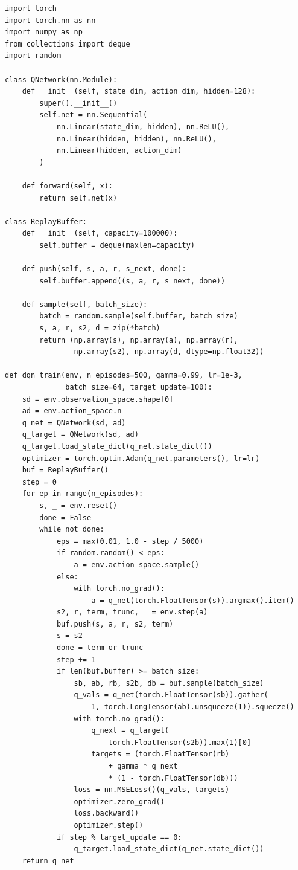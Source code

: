 \begin{codeblock}[title=\textbf{Minimal DQN with PyTorch}]
\begin{verbatim}
import torch
import torch.nn as nn
import numpy as np
from collections import deque
import random

class QNetwork(nn.Module):
    def __init__(self, state_dim, action_dim, hidden=128):
        super().__init__()
        self.net = nn.Sequential(
            nn.Linear(state_dim, hidden), nn.ReLU(),
            nn.Linear(hidden, hidden), nn.ReLU(),
            nn.Linear(hidden, action_dim)
        )

    def forward(self, x):
        return self.net(x)

class ReplayBuffer:
    def __init__(self, capacity=100000):
        self.buffer = deque(maxlen=capacity)

    def push(self, s, a, r, s_next, done):
        self.buffer.append((s, a, r, s_next, done))

    def sample(self, batch_size):
        batch = random.sample(self.buffer, batch_size)
        s, a, r, s2, d = zip(*batch)
        return (np.array(s), np.array(a), np.array(r),
                np.array(s2), np.array(d, dtype=np.float32))

def dqn_train(env, n_episodes=500, gamma=0.99, lr=1e-3,
              batch_size=64, target_update=100):
    sd = env.observation_space.shape[0]
    ad = env.action_space.n
    q_net = QNetwork(sd, ad)
    q_target = QNetwork(sd, ad)
    q_target.load_state_dict(q_net.state_dict())
    optimizer = torch.optim.Adam(q_net.parameters(), lr=lr)
    buf = ReplayBuffer()
    step = 0
    for ep in range(n_episodes):
        s, _ = env.reset()
        done = False
        while not done:
            eps = max(0.01, 1.0 - step / 5000)
            if random.random() < eps:
                a = env.action_space.sample()
            else:
                with torch.no_grad():
                    a = q_net(torch.FloatTensor(s)).argmax().item()
            s2, r, term, trunc, _ = env.step(a)
            buf.push(s, a, r, s2, term)
            s = s2
            done = term or trunc
            step += 1
            if len(buf.buffer) >= batch_size:
                sb, ab, rb, s2b, db = buf.sample(batch_size)
                q_vals = q_net(torch.FloatTensor(sb)).gather(
                    1, torch.LongTensor(ab).unsqueeze(1)).squeeze()
                with torch.no_grad():
                    q_next = q_target(
                        torch.FloatTensor(s2b)).max(1)[0]
                    targets = (torch.FloatTensor(rb)
                        + gamma * q_next
                        * (1 - torch.FloatTensor(db)))
                loss = nn.MSELoss()(q_vals, targets)
                optimizer.zero_grad()
                loss.backward()
                optimizer.step()
            if step % target_update == 0:
                q_target.load_state_dict(q_net.state_dict())
    return q_net
\end{verbatim}
\end{codeblock}

